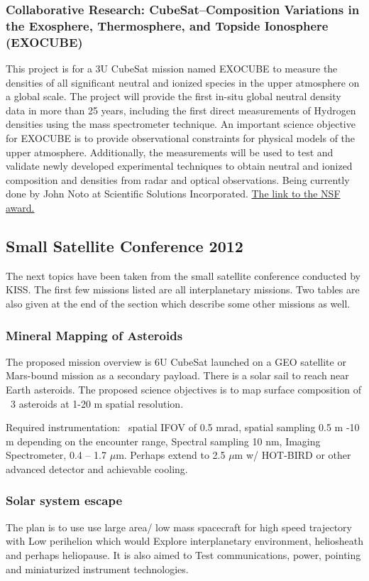 \subsubsection{Collaborative Research: CubeSat--Composition Variations in the Exosphere, Thermosphere, and Topside Ionosphere (EXOCUBE)}

This project is for a 3U CubeSat mission named EXOCUBE to measure the densities of all significant neutral and ionized species in the upper atmosphere on a global scale. The project will provide the first in-situ global neutral density data in more than 25 years, including the first direct measurements of Hydrogen densities using the mass spectrometer technique. An important science objective for EXOCUBE is to provide observational constraints for physical models of the upper atmosphere. Additionally, the measurements will be used to test and validate newly developed experimental techniques to obtain neutral and ionized composition and densities from radar and optical observations. Being currently done by John Noto at Scientific Solutions Incorporated. \href{http://nsf.gov/awardsearch/showAward?AWD_ID=1042837&HistoricalAwards=false}{The link to the NSF award.}


\subsection{Small Satellite Conference 2012}
The next topics have been taken from the small satellite conference conducted by KISS. The first few missions listed are all interplanetary missions. Two tables are also given at the end of the section which describe some other missions as well. 

\subsubsection{Mineral Mapping of Asteroids}
The proposed mission overview is 6U CubeSat launched on a GEO satellite 
or Mars-bound mission as a secondary payload. There is a solar sail to reach near Earth asteroids. The proposed science objectives is to map surface composition of ~3 asteroids at 1-20 m spatial resolution.

Required instrumentation: ~spatial IFOV of 0.5 mrad, spatial sampling 0.5 m -10 m depending on the encounter range, Spectral sampling 10 nm, Imaging Spectrometer, 0.4 – 1.7 $\mu$m. Perhaps extend to 2.5 $\mu$m w/ HOT-BIRD or 
other advanced detector and achievable cooling. 

\subsubsection{Solar system escape}
The plan is to use use large area/ low mass spacecraft for high speed trajectory with Low perihelion which would Explore interplanetary environment, heliosheath and perhaps heliopause. It is also aimed to Test communications, power, pointing and miniaturized instrument technologies.

